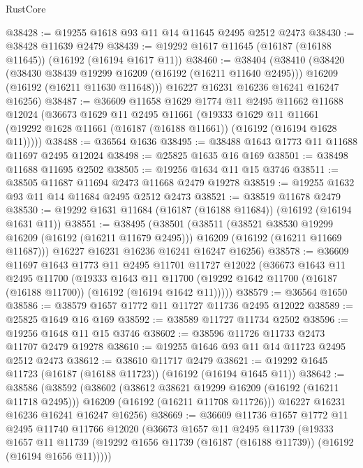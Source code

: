 \begin{lexlean}{RustCore}
\begin{coremodule}
@38428 := @19255 @1618 @93 @11 @14 @11645 @2495 @2512 @2473
@38430 := @38428 @11639 @2479
@38439 := @19292 @1617 @11645 (@16187 (@16188 @11645)) (@16192 (@16194 @1617 @11))
@38460 := @38404
    (@38410
      (@38420
        (@38430 @38439 @19299 @16209 (@16192 (@16211 @11640 @2495)))
        @16209
        (@16192 (@16211 @11630 @11648)))
      @16227
      @16231
      @16236
      @16241
      @16247
      @16256)
@38487 := @36609
    @11658
    @1629
    @1774
    @11
    @2495
    @11662
    @11688
    @12024
    (@36673
      @1629
      @11
      @2495
      @11661
      (@19333
        @1629
        @11
        @11661
        (@19292 @1628 @11661 (@16187 (@16188 @11661)) (@16192 (@16194 @1628 @11)))))
@38488 := @36564 @1636
@38495 := @38488 @1643 @1773 @11 @11688 @11697 @2495 @12024
@38498 := @25825 @1635 @16 @169
@38501 := @38498 @11688 @11695 @2502
@38505 := @19256 @1634 @11 @15 @3746
@38511 := @38505 @11687 @11694 @2473 @11668 @2479 @19278
@38519 := @19255 @1632 @93 @11 @14 @11684 @2495 @2512 @2473
@38521 := @38519 @11678 @2479
@38530 := @19292 @1631 @11684 (@16187 (@16188 @11684)) (@16192 (@16194 @1631 @11))
@38551 := @38495
    (@38501
      (@38511
        (@38521 @38530 @19299 @16209 (@16192 (@16211 @11679 @2495)))
        @16209
        (@16192 (@16211 @11669 @11687)))
      @16227
      @16231
      @16236
      @16241
      @16247
      @16256)
@38578 := @36609
    @11697
    @1643
    @1773
    @11
    @2495
    @11701
    @11727
    @12022
    (@36673
      @1643
      @11
      @2495
      @11700
      (@19333
        @1643
        @11
        @11700
        (@19292 @1642 @11700 (@16187 (@16188 @11700)) (@16192 (@16194 @1642 @11)))))
@38579 := @36564 @1650
@38586 := @38579 @1657 @1772 @11 @11727 @11736 @2495 @12022
@38589 := @25825 @1649 @16 @169
@38592 := @38589 @11727 @11734 @2502
@38596 := @19256 @1648 @11 @15 @3746
@38602 := @38596 @11726 @11733 @2473 @11707 @2479 @19278
@38610 := @19255 @1646 @93 @11 @14 @11723 @2495 @2512 @2473
@38612 := @38610 @11717 @2479
@38621 := @19292 @1645 @11723 (@16187 (@16188 @11723)) (@16192 (@16194 @1645 @11))
@38642 := @38586
    (@38592
      (@38602
        (@38612 @38621 @19299 @16209 (@16192 (@16211 @11718 @2495)))
        @16209
        (@16192 (@16211 @11708 @11726)))
      @16227
      @16231
      @16236
      @16241
      @16247
      @16256)
@38669 := @36609
    @11736
    @1657
    @1772
    @11
    @2495
    @11740
    @11766
    @12020
    (@36673
      @1657
      @11
      @2495
      @11739
      (@19333
        @1657
        @11
        @11739
        (@19292 @1656 @11739 (@16187 (@16188 @11739)) (@16192 (@16194 @1656 @11)))))

\end{coremodule}
\end{lexlean}
